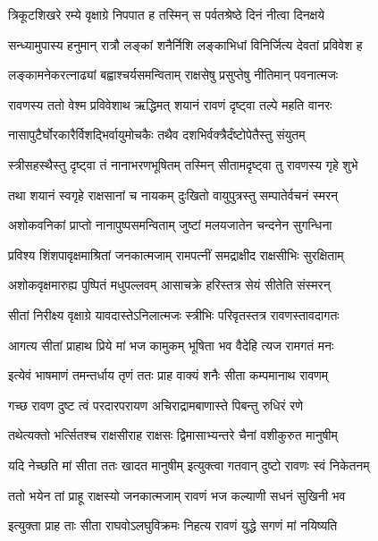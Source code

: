 \twolineshloka
{त्रिकूटशिखरे रम्ये वृक्षाग्रे निपपात ह}
{तस्मिन् स पर्वतश्रेष्ठे दिनं नीत्वा दिनक्षये} %

\twolineshloka
{सन्ध्यामुपास्य हनुमान् रात्रौ लङ्कां शनैर्निशि}
{लङ्काभिधां विनिर्जित्य देवतां प्रविवेश ह} %

\twolineshloka
{लङ्कामनेकरत्नाढ्यां बह्वाश्चर्यसमन्विताम्}
{राक्षसेषु प्रसुप्तेषु नीतिमान् पवनात्मजः} %

\twolineshloka
{रावणस्य ततो वेश्म प्रविवेशाथ ऋद्धिमत्}
{शयानं रावणं दृष्ट्वा तल्पे महति वानरः} %

\twolineshloka
{नासापुटैर्घोरकारैर्विशद्भिर्वायुमोचकैः}
{तथैव दशभिर्वक्त्रैर्दंष्टोपेतैस्तु संयुतम्} %

\twolineshloka
{स्त्रीसहस्थैस्तु दृष्ट्वा तं नानाभरणभूषितम्}
{तस्मिन् सीतामदृष्ट्वा तु रावणस्य गृहे शुभे} %

\twolineshloka
{तथा शयानं स्वगृहे राक्षसानां च नायकम्}
{दुःखितो वायुपुत्रस्तु सम्पातेर्वचनं स्मरन्} %

\twolineshloka
{अशोकवनिकां प्राप्तो नानापुष्पसमन्विताम्}
{जुष्टां मलयजातेन चन्दनेन सुगन्धिना} %

\twolineshloka
{प्रविश्य शिंशपावृक्षमाश्रितां जनकात्मजाम्}
{रामपत्नीं समद्राक्षीद राक्षसीभिः सुरक्षिताम्} %

\twolineshloka
{अशोकवृक्षमारुह्य पुष्पितं मधुपल्लवम्}
{आसाचक्रे हरिस्तत्र सेयं सीतेति संस्मरन्} %

\twolineshloka
{सीतां निरीक्ष्य वृक्षाग्रे यावदास्तेऽनिलात्मजः}
{स्त्रीभिः परिवृतस्तत्र रावणस्तावदागतः} %

\twolineshloka
{आगत्य सीतां प्राहाथ प्रिये मां भज कामुकम्}
{भूषिता भव वैदेहि त्यज रामगतं मनः} %

\twolineshloka
{इत्येवं भाषमाणं तमन्तर्धाय तृणं ततः}
{प्राह वाक्यं शनैः सीता कम्पमानाथ रावणम्} %

\twolineshloka
{गच्छ रावण दुष्ट त्वं परदारपरायण}
{अचिराद्रामबाणास्ते पिबन्तु रुधिरं रणे} %

\twolineshloka
{तथेत्यक्तो भर्त्सितश्च राक्षसीराह राक्षसः}
{द्विमासाभ्यन्तरे चैनां वशीकुरुत मानुषीम्} %

\twolineshloka
{यदि नेच्छति मां सीता ततः खादत मानुषीम्}
{इत्युक्त्वा गतवान् दुष्टो रावणः स्वं निकेतनम्} %

\twolineshloka
{ततो भयेन तां प्राहू राक्षस्यो जनकात्मजाम्}
{रावणं भज कल्याणी सधनं सुखिनी भव} %

\twolineshloka
{इत्युक्ता प्राह ताः सीता राघवोऽलघुविक्रमः}
{निहत्य रावणं युद्धे सगणं मां नयिष्यति} %


